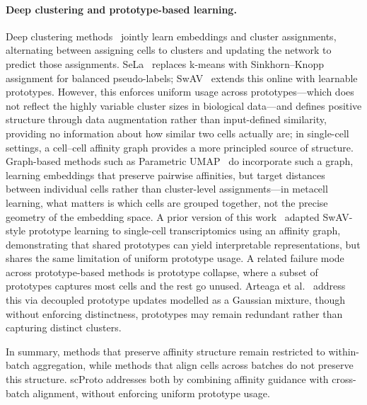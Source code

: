 \paragraph{Deep clustering and prototype-based learning.}
Deep clustering methods~\citep{deepcluster} jointly learn embeddings and cluster assignments, alternating between assigning cells to clusters and updating the network to predict those assignments.
SeLa~\citep{asano2019self} replaces k-means with Sinkhorn--Knopp~\citep{sinkhorn} assignment for balanced pseudo-labels; SwAV~\citep{swav} extends this online with learnable prototypes.
However, this enforces uniform usage across prototypes---which does not reflect the highly variable cluster sizes in biological data---and defines positive structure through data augmentation rather than input-defined similarity, providing no information about how similar two cells actually are; in single-cell settings, a cell--cell affinity graph provides a more principled source of structure.
Graph-based methods such as Parametric UMAP~\citep{parametric_umap} do incorporate such a graph, learning embeddings that preserve pairwise affinities, but target distances between individual cells rather than cluster-level assignments---in metacell learning, what matters is which cells are grouped together, not the precise geometry of the embedding space.
A prior version of this work~\citep{golpayegani2025interpretable} adapted SwAV-style prototype learning to single-cell transcriptomics using an affinity graph, demonstrating that shared prototypes can yield interpretable representations, but shares the same limitation of uniform prototype usage.
A related failure mode across prototype-based methods is prototype collapse, where a subset of prototypes captures most cells and the rest go unused. Arteaga et al.~\citep{arteaga2026prototypes} address this via decoupled prototype updates modelled as a Gaussian mixture, though without enforcing distinctness, prototypes may remain redundant rather than capturing distinct clusters.

In summary, methods that preserve affinity structure remain restricted to within-batch aggregation, while methods that align cells across batches do not preserve this structure. scProto addresses both by combining affinity guidance with cross-batch alignment, without enforcing uniform prototype usage.
